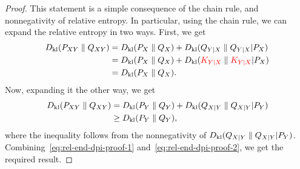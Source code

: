                 \begin{proof}
                    This statement is a simple consequence of the chain rule, and nonnegativity of relative entropy. In particular, using the chain rule, we can expand the relative entropy in two ways. First, we get  
                    \begin{align}
                        D_{\text{kl}}(P_{XY} \parallel Q_{XY}) &=  D_{\text{kl}}(P_X \parallel Q_X) + D_{\text{kl}}(Q_{Y|X} \parallel Q_{Y|X} | P_X)  \\
                        &= D_{\text{kl}}(P_X \parallel Q_X) + D_{\text{kl}}(\textcolor{red}{K_{Y|X}} \parallel \textcolor{red}{K_{Y|X}} | P_X)   \\
                        & = D_{\text{kl}}(P_X \parallel Q_X). \label{eq:rel-end-dpi-proof-1}
                    \end{align}
                    Now, expanding it the other way, we get 
                    \begin{align}
                        D_{\text{kl}}(P_{XY}\parallel Q_{XY}) & =   D_{\text{kl}}(P_Y \parallel Q_Y) + D_{\text{kl}}(Q_{X|Y} \parallel Q_{X|Y} | P_Y)  \\
                        & \geq    D_{\text{kl}}(P_Y \parallel Q_Y),  \label{eq:rel-end-dpi-proof-2}
                    \end{align}
                    where the inequality follows from the nonnegativity of $ D_{\text{kl}}(Q_{X|Y} \parallel Q_{X|Y} | P_Y)$. Combining~\eqref{eq:rel-end-dpi-proof-1} and~\eqref{eq:rel-end-dpi-proof-2}, we get the required result.
                \end{proof}

